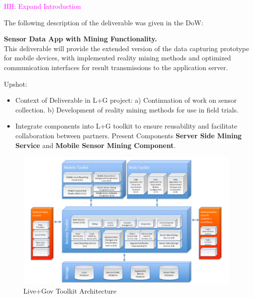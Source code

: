 \documentclass[external]{20120615_deliverable_template_ukob}
\theoremstyle{definition}
\newcommand{\todo}[2]{\textcolor{magenta}{#1: #2}}
\begin{document}
\todo{HH}{Expand Introduction}

The following description of the deliverable was given in the DoW:

\begin{center}
  \begin{minipage}{0.8 \textwidth}
    {\bf Sensor Data App with Mining Functionality.} \\
    This deliverable will provide the extended version of the data
    capturing prototype for mobile devices, with implemented reality
    mining methods and optimized communication interfaces for result
    transmissions to the application server.
\end{minipage}
\end{center}

Upshot:
\begin{itemize}
\item Context of Deliverable in L+G project:
  a) Continuation of work on sensor collection.
  b) Development of reality mining methods for use in field trials.
\item Integrate components into L+G toolkit to ensure reusability and
  facilitate collaboration between partners. Present Components 
  {\bf Server Side Mining Service} and {\bf Mobile Sensor Mining Component}.
\end{itemize}

\begin{figure}
  \centering
  \includegraphics[width = 0.8 \textwidth]{img/intro/architecture.png}
  \caption{Live+Gov Toolkit Architecture}
\end{figure}
\end{document}
